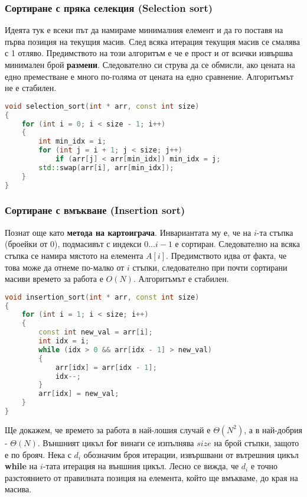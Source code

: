 \documentclass[fleqn,12pt]{article}
\begin{document}
\subsubsection{Сортиране с пряка селекция (Selection sort)}
Идеята тук е всеки път да намираме минималния елемент и да го поставя на първа позиция на текущия масив.
След всяка итерация текущия масив се смалява с 1 отляво. Предимството на този алгоритъм е че е прост и от всички
извършва минимален брой \textbf{размени}. Следователно си струва да се обмисли, ако цената на едно преместване е
много по-голяма от цената на едно сравнение. Алгоритъмът не е стабилен.

\begin{lstlisting}[language=C++, caption=Selection sort]
void selection_sort(int * arr, const int size)
{
    for (int i = 0; i < size - 1; i++)
    {
        int min_idx = i;
        for (int j = i + 1; j < size; j++) 
            if (arr[j] < arr[min_idx]) min_idx = j;
        std::swap(arr[i], arr[min_idx]);
    }
}
\end{lstlisting}

\subsubsection{Сортиране с вмъкване (Insertion sort)}
\label{sort:insertion}
Познат още като \textbf{метода на картоиграча}. Инвариантата му е, че на $i$-та стъпка (броейки от 0), подмасивът 
с индекси $0 \dots i - 1$ е сортиран. Следователно на всяка стъпка се намира мястото на елемента $A[i]$. 
Предимството идва от факта, че това може да отнеме по-малко от $i$ стъпки, следователно при почти сортирани масиви
времето за работа е $O(N)$. Алгоритъмът е стабилен.

\begin{lstlisting}[language=C++, caption=Insertion sort]
void insertion_sort(int * arr, const int size)
{
    for (int i = 1; i < size; i++)
    {
        const int new_val = arr[i];
        int idx = i;
        while (idx > 0 && arr[idx - 1] > new_val)
        {
            arr[idx] = arr[idx - 1];
            idx--; 
        }
        arr[idx] = new_val;
    }
}
\end{lstlisting}

Ще докажем, че времето за работа в най-лошия случай е $\Theta(N^2)$, а в най-добрия - $\Theta(N)$.
Външният цикъл \textbf{for} винаги се изпълнява $size$ на брой стъпки, защото е по брояч.
Нека с $d_i$ обозначим броя итерации, извършвани от вътрешния цикъл \textbf{while} на $i$-тата итерация на външния цикъл.
Лесно се вижда, че $d_i$ е точно разстоянието от правилната позиция на елемента, който ще вмъкваме, до края на масива.
\end{document}
